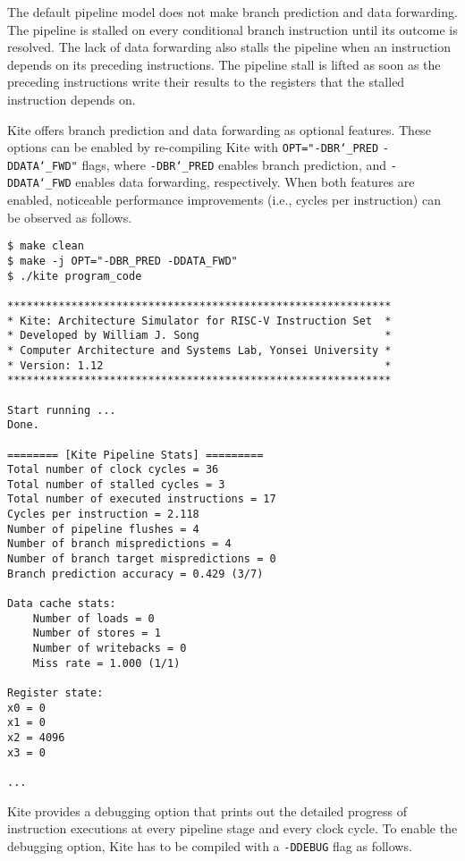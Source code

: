 \documentclass[10pt]{article}
\begin{document}
The default pipeline model does not make branch prediction and data forwarding.
The pipeline is stalled on every conditional branch instruction until its outcome is resolved.
The lack of data forwarding also stalls the pipeline when an instruction depends on its preceding instructions.
The pipeline stall is lifted as soon as the preceding instructions write their results to the registers that the stalled instruction depends on.

Kite offers branch prediction and data forwarding as optional features.
These options can be enabled by re-compiling Kite with {\tt\small OPT="-DBR\char`_PRED} {\tt\small -DDATA\char`_FWD"} flags, where {\tt\small -DBR\char`_PRED} enables branch prediction, and {\tt\small -DDATA\char`_FWD} enables data forwarding, respectively.
When both features are enabled, noticeable performance improvements (i.e., cycles per instruction) can be observed as follows.

\begin{Verbatim}[frame=single,fontsize=\small]
$ make clean
$ make -j OPT="-DBR_PRED -DDATA_FWD"
$ ./kite program_code

************************************************************
* Kite: Architecture Simulator for RISC-V Instruction Set  *
* Developed by William J. Song                             *
* Computer Architecture and Systems Lab, Yonsei University *
* Version: 1.12                                            *
************************************************************

Start running ...
Done.

======== [Kite Pipeline Stats] =========
Total number of clock cycles = 36
Total number of stalled cycles = 3
Total number of executed instructions = 17
Cycles per instruction = 2.118
Number of pipeline flushes = 4
Number of branch mispredictions = 4
Number of branch target mispredictions = 0
Branch prediction accuracy = 0.429 (3/7)

Data cache stats:
    Number of loads = 0
    Number of stores = 1
    Number of writebacks = 0
    Miss rate = 1.000 (1/1)

Register state:
x0 = 0
x1 = 0
x2 = 4096
x3 = 0

...

\end{Verbatim}

Kite provides a debugging option that prints out the detailed progress of instruction executions at every pipeline stage and every clock cycle.
To enable the debugging option, Kite has to be compiled with a {\tt\small -DDEBUG} flag as follows.
\end{document}
